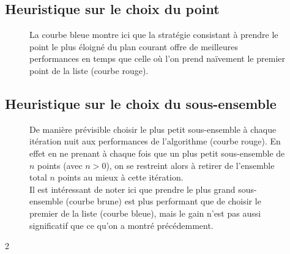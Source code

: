 \documentclass[]{article}
\begin{document}
\begin{multicols}{2}
	\subsection{Heuristique sur le choix du point}\label{heur_choix_du_point}
	\begin{figure}[H]
		\caption{La courbe bleue montre ici que la stratégie consistant à prendre le point le plus éloigné du plan courant offre de meilleures performances en temps que celle où l'on prend naïvement le premier point de la liste (courbe rouge).}
	\end{figure}

	\subsection{Heuristique sur le choix du sous-ensemble}\label{heur_choix_du_sous_ens}
	\begin{figure}[H]
		\caption{
			De manière prévisible choisir le plus petit sous-ensemble à chaque itération nuit aux performances de l'algorithme (courbe rouge). En effet en ne prenant à chaque fois que un plus petit sous-ensemble de $n$ points (avec $n > 0$), on se restreint alors à retirer de l'ensemble total $n$ points au mieux à cette itération.\\
			Il est intéressant de noter ici que prendre le plus grand sous-ensemble (courbe brune) est plus performant que de choisir le premier de la liste (courbe bleue), mais le gain n'est pas aussi significatif que ce qu'on a montré précédemment.
		}
	\end{figure}

\end{multicols}{2}
\end{document}

